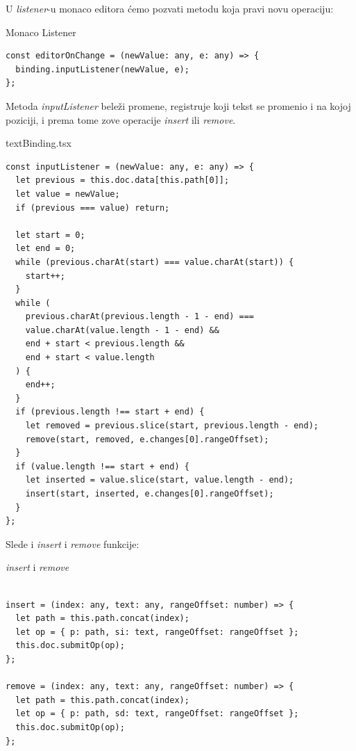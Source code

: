 \documentclass[12pt]{article}
\begin{document}
U \textit{listener}-u monaco editora ćemo pozvati metodu koja pravi novu operaciju:

\begin{mylisting}[label={lst:example}]{Monaco Listener}
\begin{lstlisting}
const editorOnChange = (newValue: any, e: any) => {
  binding.inputListener(newValue, e);
};
\end{lstlisting}
\end{mylisting}

Metoda \textit{inputListener} beleži promene, registruje koji tekst se promenio i na kojoj poziciji, i prema tome zove operacije \textit{insert} ili \textit{remove}. 

\begin{mylisting}[label={lst:example}]{textBinding.tsx}
\begin{lstlisting}
const inputListener = (newValue: any, e: any) => {
  let previous = this.doc.data[this.path[0]];
  let value = newValue;
  if (previous === value) return;

  let start = 0;
  let end = 0;
  while (previous.charAt(start) === value.charAt(start)) {
    start++;
  }
  while (
    previous.charAt(previous.length - 1 - end) === 
    value.charAt(value.length - 1 - end) &&
    end + start < previous.length &&
    end + start < value.length
  ) {
    end++;
  }
  if (previous.length !== start + end) {
    let removed = previous.slice(start, previous.length - end);
    remove(start, removed, e.changes[0].rangeOffset);
  }
  if (value.length !== start + end) {
    let inserted = value.slice(start, value.length - end);
    insert(start, inserted, e.changes[0].rangeOffset);
  }
};
\end{lstlisting}
\end{mylisting}

Slede i \textit{insert} i \textit{remove} funkcije:

\begin{mylisting}[label={lst:example}]{\textit{insert} i \textit{remove}}
\begin{lstlisting}

insert = (index: any, text: any, rangeOffset: number) => {
  let path = this.path.concat(index);
  let op = { p: path, si: text, rangeOffset: rangeOffset };
  this.doc.submitOp(op);
};

remove = (index: any, text: any, rangeOffset: number) => {
  let path = this.path.concat(index);
  let op = { p: path, sd: text, rangeOffset: rangeOffset };
  this.doc.submitOp(op);
};
\end{lstlisting}
\end{mylisting}
\end{document}

